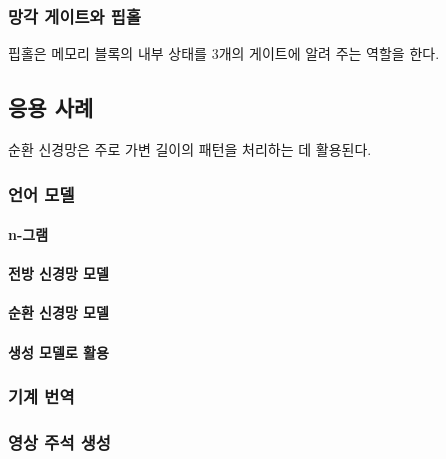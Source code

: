 \documentclass [12pt] {oblivoir}
\let\oldsubsubsection=\subsubsection
\renewcommand{\subsubsection}
{
  \filbreak
  \oldsubsubsection
}
\begin{document}
\vspace{3mm}

\subsubsection{망각 게이트와 핍홀}

핍홀은 메모리 블록의 내부 상태를 3개의 게이트에 알려 주는 역할을 한다.

\subsection{응용 사례}

순환 신경망은 주로 가변 길이의 패턴을 처리하는 데 활용된다.

\subsubsection{언어 모델}

\paragraph*{n-그램}\mbox{}

\vspace{3mm}

\paragraph*{전방 신경망 모델}\mbox{}

\vspace{3mm}

\paragraph*{순환 신경망 모델}\mbox{}

\vspace{3mm}

\paragraph*{생성 모델로 활용}\mbox{}

\vspace{3mm}

\subsubsection{기계 번역}

\subsubsection{영상 주석 생성}
\end{document}
